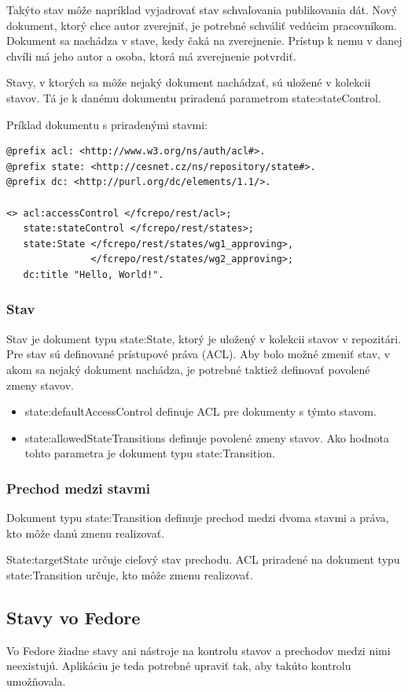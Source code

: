 \documentclass[thesis=M,slovak]{FITthesis}[2013/05/06]
\begin{document}
Takýto stav môže napríklad vyjadrovať stav schvaľovania publikovania dát. Nový dokument, ktorý chce autor zverejniť, je potrebné schváliť vedúcim pracovníkom. Dokument sa nachádza v stave, kedy čaká na zverejnenie. Prístup k nemu v danej chvíli má jeho autor a osoba, ktorá má zverejnenie potvrdiť.

Stavy, v ktorých sa môže nejaký dokument nachádzať, sú uložené v kolekcii stavov. Tá je k danému dokumentu priradená parametrom state:stateControl.

Príklad dokumentu s priradenými stavmi:
\begin{lstlisting}[frame=single] 
@prefix acl: <http://www.w3.org/ns/auth/acl#>.
@prefix state: <http://cesnet.cz/ns/repository/state#>.
@prefix dc: <http://purl.org/dc/elements/1.1/>.

<> acl:accessControl </fcrepo/rest/acl>;
   state:stateControl </fcrepo/rest/states>;
   state:State </fcrepo/rest/states/wg1_approving>,
               </fcrepo/rest/states/wg2_approving>;
   dc:title "Hello, World!".
\end{lstlisting}

\subsubsection{Stav}
Stav je dokument typu state:State, ktorý je uložený v kolekcii stavov v repozitári. Pre stav sú definované prístupové práva (ACL). Aby bolo možné zmeniť stav, v akom sa nejaký dokument nachádza, je potrebné taktiež definovať povolené zmeny stavov.

\begin{itemize}
	\item state:defaultAccessControl definuje ACL pre dokumenty s týmto stavom.
	\item state:allowedStateTransitions definuje povolené zmeny stavov. Ako hodnota tohto parametra je dokument typu state:Transition.
\end{itemize}

\subsubsection{Prechod medzi stavmi}
Dokument typu state:Transition definuje prechod medzi dvoma stavmi a práva, kto môže danú zmenu realizovať.

State:targetState určuje cieľový stav prechodu.
ACL priradené na dokument typu state:Transition určuje, kto môže zmenu realizovať.

\subsection{Stavy vo Fedore}
Vo Fedore žiadne stavy ani nástroje na kontrolu stavov a prechodov medzi nimi neexistujú. Aplikáciu je teda potrebné upraviť tak, aby takúto kontrolu umožňovala.
\end{document}
